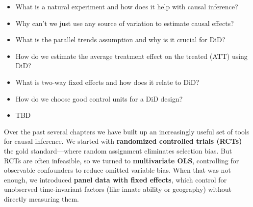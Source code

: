 \documentclass[
  letterpaper,
  DIV=11,
  numbers=noendperiod]{scrreprt}
\providecommand{\tightlist}{%
  \setlength{\itemsep}{0pt}\setlength{\parskip}{0pt}}
\begin{document}
\begin{tcolorbox}[enhanced jigsaw, arc=.35mm, bottomrule=.15mm, bottomtitle=1mm, breakable, colback=white, colbacktitle=quarto-callout-tip-color!10!white, colframe=quarto-callout-tip-color-frame, coltitle=black, left=2mm, leftrule=.75mm, opacityback=0, opacitybacktitle=0.6, rightrule=.15mm, title=\textcolor{quarto-callout-tip-color}{\faLightbulb}\hspace{0.5em}{\textbf{Key Questions}}, titlerule=0mm, toprule=.15mm, toptitle=1mm]

\begin{itemize}
\tightlist
\item
  What is a natural experiment and how does it help with causal
  inference?
\item
  Why can't we just use any source of variation to estimate causal
  effects?
\item
  What is the parallel trends assumption and why is it crucial for DiD?
\item
  How do we estimate the average treatment effect on the treated (ATT)
  using DiD?
\item
  What is two-way fixed effects and how does it relate to DiD?
\item
  How do we choose good control units for a DiD design?
\end{itemize}

\end{tcolorbox}

\begin{tcolorbox}[enhanced jigsaw, arc=.35mm, bottomrule=.15mm, bottomtitle=1mm, breakable, colback=white, colbacktitle=quarto-callout-note-color!10!white, colframe=quarto-callout-note-color-frame, coltitle=black, left=2mm, leftrule=.75mm, opacityback=0, opacitybacktitle=0.6, rightrule=.15mm, title=\textcolor{quarto-callout-note-color}{\faInfo}\hspace{0.5em}{\textbf{Suggested Readings}}, titlerule=0mm, toprule=.15mm, toptitle=1mm]

\begin{itemize}
\tightlist
\item
  TBD
\end{itemize}

\end{tcolorbox}

Over the past several chapters we have built up an increasingly useful
set of tools for causal inference. We started with \textbf{randomized
controlled trials (RCTs)}---the gold standard---where random assignment
eliminates selection bias. But RCTs are often infeasible, so we turned
to \textbf{multivariate OLS}, controlling for observable confounders to
reduce omitted variable bias. When that was not enough, we introduced
\textbf{panel data with fixed effects}, which control for unobserved
time-invariant factors (like innate ability or geography) without
directly measuring them.
\end{document}
